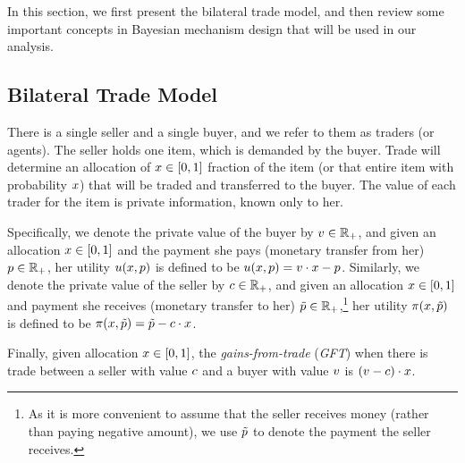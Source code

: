 \label{sec:prelim}

In this section, we first present the bilateral trade model, and then review some important concepts in Bayesian mechanism design that will be used in our analysis. 

\subsection{Bilateral Trade Model}
There is a single seller and a single buyer, and we refer to them as traders (or agents). 
The seller holds one item, which is demanded by the buyer. 
{Trade will determine an allocation of $x\in[0, 1]$ fraction of the item (or that entire item with probability $x$) that will be traded and transferred to the buyer.} 
The value of each trader for the item is private information, known only to her. 

Specifically, we denote the private value of the buyer by $v\in\mathbb{R}_+$, and given an allocation $x\in[0, 1]$ and the payment she pays (monetary transfer from her) $p\in\mathbb{R}_+$, her utility $u(x,p)$ is defined to be $u(x,p) = v\cdot x - p$.
Similarly, we denote the private value of the seller by $c\in\mathbb{R}_+$, and given an allocation $x\in[0, 1]$ and payment she receives (monetary transfer to her) $\tilde{p}\in \mathbb{R}_+$,\footnote{As it is more convenient  to assume that the seller receives money (rather than paying negative amount), we use $\tilde{p}$ to denote the payment the seller receives.} her utility $\pi(x, \tilde{p})$ is defined to be $\pi(x, \tilde{p}) = \tilde{p} - c \cdot x$.

Finally, given allocation $x\in[0, 1]$, the \emph{gains-from-trade} (\emph{GFT}) when there is trade between a seller with value $c$ and a buyer with value $v$ is $(v - c)\cdot x$.

